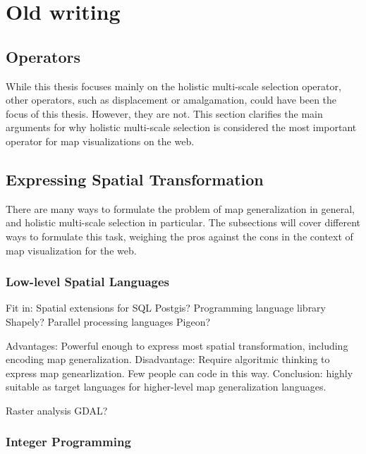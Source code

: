 \documentclass[11pt, oneside]{report}
\begin{document}
\chapter{Old writing}

\section{Operators}
\label{state:of:the:art:map:generalization:operators}

While this thesis focuses mainly on the holistic multi-scale selection operator, other operators, such as displacement or amalgamation, could have been the focus of this thesis. However, they are not. This section clarifies the main arguments for why holistic multi-scale selection is considered the most important operator for map visualizations on the web.


\section{Expressing Spatial Transformation}
\label{state:of:the:art:programming:multiscale:selection}



There are many ways to formulate the problem of map generalization in general, and holistic multi-scale selection in particular. The subsections will cover different ways to formulate this task, weighing the pros against the cons in the context of map visualization for the web.

\subsection{Low-level Spatial Languages}

Fit in: Spatial extensions for SQL Postgis? Programming language library Shapely? Parallel processing languages Pigeon?

Advantages: Powerful enough to express most spatial transformation, including encoding map generalization. Disadvantage: Require algoritmic thinking to express map genearlization. Few people can code in this way. Conclusion: highly suitable as target languages for higher-level map generalization languages.


Raster analysis GDAL?

\subsection{Integer Programming}
\end{document}
